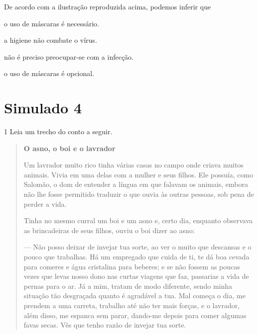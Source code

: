 
De acordo com a ilustração reproduzida acima, podemos inferir que

\begin{escolha}
  \item o uso de máscaras é necessário.

  \item a higiene não combate o vírus.

  \item não é preciso preocupar-se com a infecção.

  \item o uso de máscaras é opcional.
\end{escolha}



\chapter{Simulado 4}

\num{1} Leia um trecho do conto a seguir.

\begin{quote}
\textbf{O asno, o boi e o lavrador}

Um lavrador muito rico tinha várias casas no campo onde criava muitos
animais. Vivia em uma delas com a mulher e seus filhos. Ele possuía,
como Salomão, o dom de entender a língua em que falavam os animais,
embora não lhe fosse permitido traduzir o que ouvia às outras pessoas,
sob pena de perder a vida.

Tinha no mesmo curral um boi e um asno e, certo dia, enquanto observava
as brincadeiras de seus filhos, ouviu o boi dizer ao asno:

--- Não posso deixar de invejar tua sorte, ao ver o muito que descansas e
o pouco que trabalhas. Há um empregado que cuida de ti, te dá boa cevada
para comeres e água cristalina para beberes; e se não fossem as poucas
vezes que levas nosso dono nas curtas viagens que faz, passarias a vida
de pernas para o ar. Já a mim, tratam de modo diferente, sendo minha
situação tão desgraçada quanto é agradável a tua. Mal começa o dia, me
prendem a uma carreta, trabalho até não ter mais forças, e o lavrador,
além disso, me espanca sem parar, dando-me depois para comer algumas
favas secas. Vês que tenho razão de invejar tua sorte.
\end{quote}

